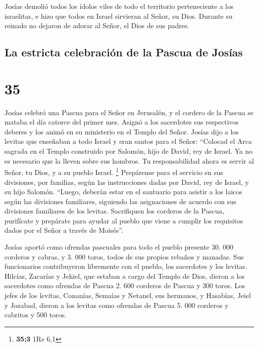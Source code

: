  Josías demolió todos los ídolos viles de todo el
territorio perteneciente a los israelitas, e hizo que todos en Israel
sirvieran al Señor, su Dios. Durante su reinado no dejaron de adorar al
Señor, el Dios de sus padres.

\hypertarget{la-estricta-celebraciuxf3n-de-la-pascua-de-josuxedas}{%
\subsection{La estricta celebración de la Pascua de
Josías}\label{la-estricta-celebraciuxf3n-de-la-pascua-de-josuxedas}}

\hypertarget{section-34}{%
\section{35}\label{section-34}}

 Josías celebró una Pascua para el Señor en Jerusalén, y
el cordero de la Pascua se mataba el día catorce del primer mes.
 Asignó a los sacerdotes sus respectivos deberes y los
animó en su ministerio en el Templo del Señor.  Josías
dijo a los levitas que enseñaban a todo Israel y eran santos para el
Señor: ``Colocad el Arca sagrada en el Templo construido por Salomón,
hijo de David, rey de Israel. Ya no es necesario que la lleven sobre sus
hombros. Tu responsabilidad ahora es servir al Señor, tu Dios, y a su
pueblo Israel. \footnote{\textbf{35:3} 1Re 6,1} 
Prepárense para el servicio en sus divisiones, por familias, según las
instrucciones dadas por David, rey de Israel, y su hijo Salomón.
 ``Luego, deberán estar en el santuario para asistir a los
laicos según las divisiones familiares, siguiendo las asignaciones de
acuerdo con sus divisiones familiares de los levitas. 
Sacrifiquen los corderos de la Pascua, purifícate y prepárate para
ayudar al pueblo que viene a cumplir los requisitos dados por el Señor a
través de Moisés''.

 Josías aportó como ofrendas pascuales para todo el pueblo
presente 30. 000 corderos y cabras, y 3. 000 toros, todos de sus propios
rebaños y manadas.  Sus funcionarios contribuyeron
libremente con el pueblo, los sacerdotes y los levitas. Hilcías,
Zacarías y Jehiel, que estaban a cargo del Templo de Dios, dieron a los
sacerdotes como ofrendas de Pascua 2. 600 corderos de Pascua y 300
toros.  Los jefes de los levitas, Conanías, Semaías y
Netanel, sus hermanos, y Hasabías, Jeiel y Jozabad, dieron a los levitas
como ofrendas de Pascua 5. 000 corderos y cabritos y 500 toros.

